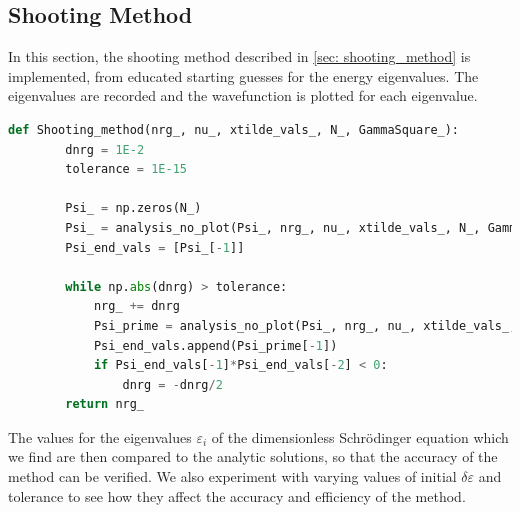 \documentclass[10pt,a4paper]{article}
\theoremstyle{definition}
\theoremstyle{remark}
\begin{document}
\subsection{Shooting Method}
\label{sec: shooting_method implementation}
In this section, the shooting method described in \ref{sec: shooting_method} is implemented, from educated starting guesses for the energy eigenvalues. The eigenvalues are recorded and the wavefunction is plotted for each eigenvalue.
\begin{lstlisting}[language=Python]
    def Shooting_method(nrg_, nu_, xtilde_vals_, N_, GammaSquare_):
        dnrg = 1E-2
        tolerance = 1E-15

        Psi_ = np.zeros(N_)
        Psi_ = analysis_no_plot(Psi_, nrg_, nu_, xtilde_vals_, N_, GammaSquare_)
        Psi_end_vals = [Psi_[-1]]

        while np.abs(dnrg) > tolerance:
            nrg_ += dnrg
            Psi_prime = analysis_no_plot(Psi_, nrg_, nu_, xtilde_vals_, N_, GammaSquare_)
            Psi_end_vals.append(Psi_prime[-1])
            if Psi_end_vals[-1]*Psi_end_vals[-2] < 0:
                dnrg = -dnrg/2
        return nrg_
\end{lstlisting}
The values for the eigenvalues $\varepsilon_i$ of the dimensionless Schr\"{o}dinger equation which we find are then compared to the analytic solutions, so that the accuracy of the method can be verified. We also experiment with varying values of initial $\delta\varepsilon$ and tolerance to see how they affect the accuracy and efficiency of the method.\\
\end{document}

